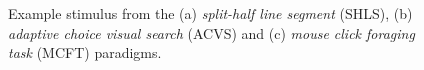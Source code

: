 \documentclass[Afour, sageapa, times]{sagej}
\begin{document}
\begin{figure}
\centering
{}
\caption{Example stimulus from the (a) \textit{split-half line segment} (SHLS), (b) \textit{adaptive choice visual search} (ACVS) and (c) \textit{mouse click foraging task} (MCFT) paradigms.}
\label{fig:exampleStimuli}
\end{figure}
\end{document}
